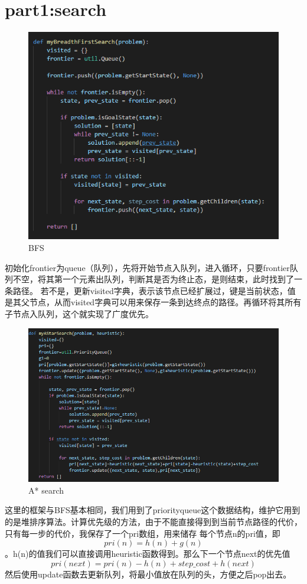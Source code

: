 \documentclass{report}
\begin{document}
    \section{part1:search}
    \begin{figure}[h]
        \centering
        \includegraphics[width=15cm]{1.png}
        \caption{BFS}
    \end{figure}
    初始化frontier为queue（队列），先将开始节点入队列，进入循环，只要frontier队列不空，将其第一个元素出队列，判断其是否为终止态，是则结束，此时找到了一条路径。
    若不是，更新visited字典，表示该节点已经扩展过，键是当前状态，值是其父节点，从而visited字典可以用来保存一条到达终点的路径。再循环将其所有子节点入队列，这个就实现了广度优先。
    \begin{figure}[h]
        \centering
        \includegraphics[width=15cm]{2.png}
        \caption{A* search}
    \end{figure}
    这里的框架与BFS基本相同，我们用到了priorityqueue这个数据结构，维护它用到的是堆排序算法。计算优先级的方法，由于不能直接得到到当前节点路径的代价，只有每一步的代价，我保存了一个pri数组，用来储存
    每个节点n的pri值，即$$pri(n)=h(n)+g(n)$$。h(n)的值我们可以直接调用heuristic函数得到。那么下一个节点next的优先值$$pri(next)=pri(n)-h(n)+step\_cost+h(next)$$
    然后使用update函数去更新队列，将最小值放在队列的头，方便之后pop出去。
\end{document}

